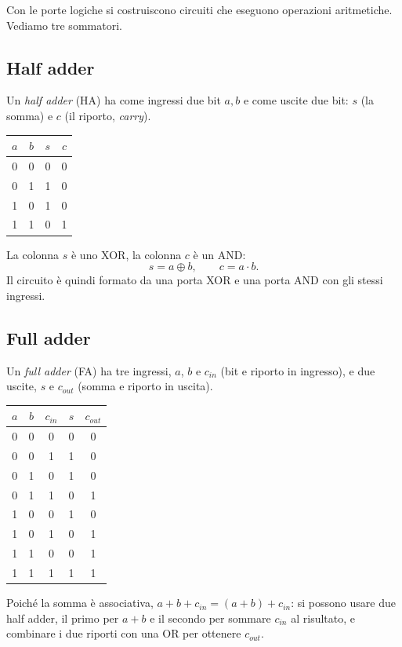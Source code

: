 \documentclass[11pt,a4paper]{article}
\begin{document}
Con le porte logiche si costruiscono circuiti che eseguono operazioni aritmetiche. Vediamo tre sommatori.

\subsection{Half adder}

Un \emph{half adder} (HA) ha come ingressi due bit $a, b$ e come uscite due bit: $s$ (la somma) e $c$ (il riporto, \emph{carry}).
\begin{center}
\begin{tabular}{cc|cc}
\toprule
$a$ & $b$ & $s$ & $c$ \\
\midrule
0 & 0 & 0 & 0 \\
0 & 1 & 1 & 0 \\
1 & 0 & 1 & 0 \\
1 & 1 & 0 & 1 \\
\bottomrule
\end{tabular}
\end{center}
La colonna $s$ è uno XOR, la colonna $c$ è un AND:
\[
s = a \oplus b, \qquad c = a \cdot b.
\]
Il circuito è quindi formato da una porta XOR e una porta AND con gli stessi ingressi.

\subsection{Full adder}

Un \emph{full adder} (FA) ha tre ingressi, $a$, $b$ e $c_{in}$ (bit e riporto in ingresso), e due uscite, $s$ e $c_{out}$ (somma e riporto in uscita).
\begin{center}
\begin{tabular}{ccc|cc}
\toprule
$a$ & $b$ & $c_{in}$ & $s$ & $c_{out}$ \\
\midrule
0 & 0 & 0 & 0 & 0 \\
0 & 0 & 1 & 1 & 0 \\
0 & 1 & 0 & 1 & 0 \\
0 & 1 & 1 & 0 & 1 \\
1 & 0 & 0 & 1 & 0 \\
1 & 0 & 1 & 0 & 1 \\
1 & 1 & 0 & 0 & 1 \\
1 & 1 & 1 & 1 & 1 \\
\bottomrule
\end{tabular}
\end{center}
Poiché la somma è associativa, $a + b + c_{in} = (a + b) + c_{in}$: si possono usare due half adder, il primo per $a + b$ e il secondo per sommare $c_{in}$ al risultato, e combinare i due riporti con una OR per ottenere $c_{out}$.
\end{document}
